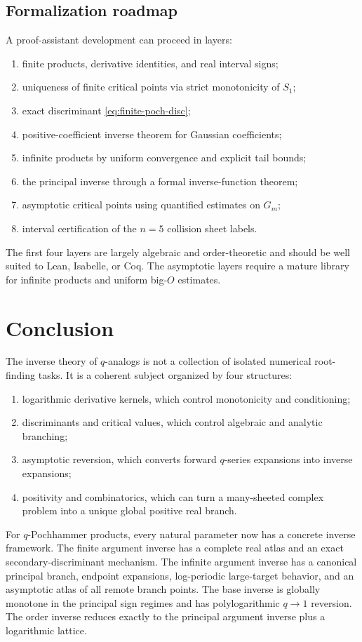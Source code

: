 \documentclass[11pt,oneside]{article}
\theoremstyle{definition}
\theoremstyle{remark}
\theoremstyle{plain}
\theoremstyle{definition}
\theoremstyle{remark}
\numberwithin{equation}{section}
\numberwithin{figure}{section}
\numberwithin{table}{section}
\let\reporttopsection\section
\let\reportsubsection\subsection
\let\reportsubsubsection\subsubsection
\let\chapter\reporttopsection
\let\section\reportsubsection
\let\subsection\reportsubsubsection
\begin{document}
\section{Formalization roadmap}
A proof-assistant development can proceed in layers:
\begin{enumerate}[label=\arabic*.]
\item finite products, derivative identities, and real interval signs;
\item uniqueness of finite critical points via strict monotonicity of \(S_1\);
\item exact discriminant \eqref{eq:finite-poch-disc};
\item positive-coefficient inverse theorem for Gaussian coefficients;
\item infinite products by uniform convergence and explicit tail bounds;
\item the principal inverse through a formal inverse-function theorem;
\item asymptotic critical points using quantified estimates on \(G_m\);
\item interval certification of the \(n=5\) collision sheet labels.
\end{enumerate}
The first four layers are largely algebraic and order-theoretic and should be
well suited to Lean, Isabelle, or Coq.  The asymptotic layers require a mature
library for infinite products and uniform big-\(O\) estimates.

\chapter{Conclusion}
The inverse theory of \(q\)-analogs is not a collection of isolated numerical
root-finding tasks.  It is a coherent subject organized by four structures:
\begin{enumerate}[label=(\roman*)]
\item logarithmic derivative kernels, which control monotonicity and
conditioning;
\item discriminants and critical values, which control algebraic and analytic
branching;
\item asymptotic reversion, which converts forward \(q\)-series expansions into
inverse expansions;
\item positivity and combinatorics, which can turn a many-sheeted complex
problem into a unique global positive real branch.
\end{enumerate}

For \(q\)-Pochhammer products, every natural parameter now has a concrete
inverse framework.  The finite argument inverse has a complete real atlas and
an exact secondary-discriminant mechanism.  The infinite argument inverse has a
canonical principal branch, endpoint expansions, log-periodic large-target
behavior, and an asymptotic atlas of all remote branch points.  The base inverse
is globally monotone in the principal sign regimes and has polylogarithmic
\(q\to1\) reversion.  The order inverse reduces exactly to the principal
argument inverse plus a logarithmic lattice.
\end{document}
